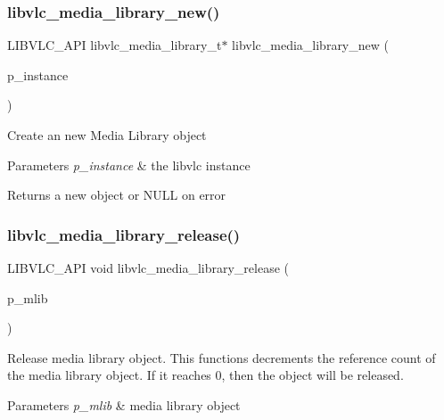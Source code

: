 \subsubsection{\texorpdfstring{libvlc\+\_\+media\+\_\+library\+\_\+new()}{libvlc\_media\_library\_new()}}
{\footnotesize\ttfamily L\+I\+B\+V\+L\+C\+\_\+\+A\+PI libvlc\+\_\+media\+\_\+library\+\_\+t$\ast$ libvlc\+\_\+media\+\_\+library\+\_\+new (\begin{DoxyParamCaption}\item[{\hyperlink{group__libvlc__core_ga316d739a80da4678206c79f4d6c2e284}{libvlc\+\_\+instance\+\_\+t} $\ast$}]{p\+\_\+instance }\end{DoxyParamCaption})}

Create an new Media Library object


\begin{DoxyParams}{Parameters}
{\em p\+\_\+instance} & the libvlc instance \\
\hline
\end{DoxyParams}
\begin{DoxyReturn}{Returns}
a new object or N\+U\+LL on error 
\end{DoxyReturn}
\mbox{\label{group__libvlc__media__library_ga334af602d7829cd26e6a0591fff5bf6d}} 
\subsubsection{\texorpdfstring{libvlc\+\_\+media\+\_\+library\+\_\+release()}{libvlc\_media\_library\_release()}}
{\footnotesize\ttfamily L\+I\+B\+V\+L\+C\+\_\+\+A\+PI void libvlc\+\_\+media\+\_\+library\+\_\+release (\begin{DoxyParamCaption}\item[{libvlc\+\_\+media\+\_\+library\+\_\+t $\ast$}]{p\+\_\+mlib }\end{DoxyParamCaption})}

Release media library object. This functions decrements the reference count of the media library object. If it reaches 0, then the object will be released.


\begin{DoxyParams}{Parameters}
{\em p\+\_\+mlib} & media library object \\
\hline
\end{DoxyParams}
\mbox{\label{group__libvlc__media__library_gaecb327371dd64fbd23e77637b32a8091}} 
